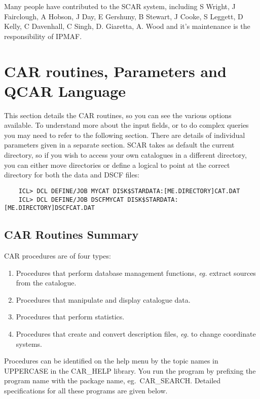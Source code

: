 Many people have contributed to the SCAR system, including S Wright,
J Fairclough, A Hobson, J Day, E Gershuny, B Stewart, J Cooke, S Leggett,
D Kelly, C Davenhall, C Singh, D. Giaretta, A. Wood and it's maintenance
is the responsibility of IPMAF.


\section {CAR routines, Parameters and QCAR Language}

This section details the CAR routines, so you can see the various options
available.
To understand more about the input fields, or to do complex queries you may
need to refer to the following section.
There are details of individual parameters given in a separate section.
SCAR takes as default the current directory, so if you
wish to access your own catalogues in a different directory, you can either
move directories
or define a logical to point at the correct directory
for both the data and DSCF files:
\begin{verbatim}
    ICL> DCL DEFINE/JOB MYCAT DISK$STARDATA:[ME.DIRECTORY]CAT.DAT
    ICL> DCL DEFINE/JOB DSCFMYCAT DISK$STARDATA:[ME.DIRECTORY]DSCFCAT.DAT
\end{verbatim}


\subsection {CAR Routines Summary}
CAR procedures are of four types:
\begin{enumerate}
\item Procedures that perform database management functions, {\em eg.} extract
sources from the catalogue.
\item Procedures that manipulate and display catalogue data.
\item Procedures that perform statistics.
\item Procedures that create and convert description files, {\em eg.} to change
coordinate systems.
\end{enumerate}
Procedures can be identified on the help menu by the topic names in UPPERCASE in
the CAR\_HELP library.
You run the program by prefixing the program name with the package name,
eg.\ CAR\_SEARCH.
Detailed specifications for all these programs are given below.

